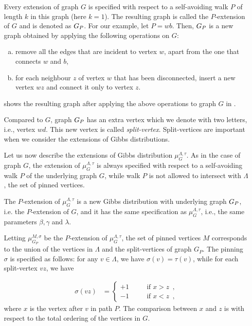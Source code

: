 \documentclass[11pt,reqno]{amsart}
\numberwithin{equation}{section}
\newcommand{\blue}[1]{{\color{blue}#1}}
\newcommand{\bluepigment}[1]{{\color{blue(pigment)}#1}}
\newcommand{\cadmiumgreen}[1]{{\color{cadmiumgreen}#1}}
\newcommand{\deeppink}[1]{{\color{deeppink}#1}}
\newcommand{\electricviolet}[1]{{\color{electricviolet}#1}}
\newcommand{\goldenbrown}[1]{{\color{goldenbrown}#1}}
\newcommand{\heliotrope}[1]{{\color{heliotrope}#1}}
\renewcommand{\blue}[1]{#1}
\renewcommand{\bluepigment}[1]{#1}
\renewcommand{\cadmiumgreen}[1]{#1}
\renewcommand{\deeppink}[1]{#1}
\renewcommand{\electricviolet}[1]{#1}
\renewcommand{\goldenbrown}[1]{#1}
\renewcommand{\heliotrope}[1]{#1}
\newcommand{\kb}{\deeppink{b}}
\newcommand{\kd}{\goldenbrown{d}}
\newcommand{\kk}{\bluepigment{k}}
\newcommand{\kP}{\goldenbrown{P}}
\newcommand{\kv}{\electricviolet{v}}
\newcommand{\kw}{\blue{w}}
\newcommand{\kx}{\heliotrope{x}}
\newcommand{\kz}{\cadmiumgreen{z}}
\renewcommand{\kb}{b}
\renewcommand{\kd}{d}
\renewcommand{\kk}{k}
\renewcommand{\kP}{P}
\renewcommand{\kv}{v}
\renewcommand{\kw}{w}
\renewcommand{\kx}{x}
\renewcommand{\kz}{z}
\begin{document}
Every extension of graph $G$ is  specified with respect to a self-avoiding walk $\kP$  of length $\kk$ 
in this graph (here $\kk=1$). The resulting graph is called the $\kP$-extension of $G$ and is 
denoted as $\gext{G}{\kP}$. For our example, let $\kP=\kw\kb$. Then, $\gext{G}{\kP}$ is a new 
graph obtained by applying the following operations on $G$:
\begin{enumerate}[(a)]
\item remove all the edges that are incident to vertex $\kw$, apart from the one that connects 
$\kw$  and $\kb$,
\item for each neighbour $\kz$ of vertex $\kw$ that has been disconnected, insert a new vertex 
$\kw\kz$ and connect it only to vertex $\kz$.
\end{enumerate}
%
 shows the resulting graph after applying the above operations to graph $G$ in 
. 



Compared to $G$, graph $\gext{G}{\kP}$ has an extra vertex which we denote with two letters, i.e.,
vertex $\kw\kd$. This new vertex is called  {\em split-vertex}. Split-vertices are important when  
we consider the extensions of Gibbs distributions.



Let us now describe the extensions of Gibbs distribution $\mu^{\Lambda,\tau}_G$.  As in the case
of graph $G$, the  extension of  $\mu^{\Lambda,\tau}_G$ is always specified with respect to a 
self-avoiding walk $\kP$ of the underlying graph $G$, while  walk $\kP$ is not allowed to intersect
with $\Lambda$, the set of pinned vertices. 

The $\kP$-extension of  $\mu^{\Lambda,\tau}_G$ is a new Gibbs distribution with underlying graph $\gext{G}{\kP}$, i.e.
the $\kP$-extension of $G$, and it has the same specification as   $\mu^{\Lambda,\tau}_G$, i.e., the same parameters
$\beta,\gamma$ and $\lambda$.  

Letting $\mu^{M,\sigma}_{G_{\kP}}$ be the $\kP$-extension of  $\mu^{\Lambda,\tau}_G$, 
the set of pinned vertices $M$ corresponds to the union of the vertices in $\Lambda$ and the split-vertices of graph $G_{\kP}$. 
% 
The pinning $\sigma$ is specified as follows: for any $\kv\in \Lambda$, we have
$\sigma(\kv)=\tau(\kv)$, while for each  split-vertex $\kv\kz$, we have

\begin{align}
% 
\sigma(\kv \kz) &= \left\{
\begin{array}{lcl}
+1& \quad & \textrm{if $\kx>\kz$}\enspace,\\ 
-1& \quad &\textrm{if $\kx<\kz$} \enspace,
\end{array}
\right. 
\end{align}
where $\kx$ is the vertex after $\kv$ in path $\kP$. The comparison between $\kx$ and $\kz$ is with respect to the
total ordering of the vertices in $G$. 
%
\end{document}
